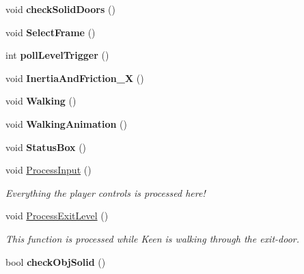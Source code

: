 \begin{DoxyCompactItemize}
\item 
\hypertarget{class_c_player_aaf29ec91431dddfa0072db4d9fad8549}{
void {\bfseries checkSolidDoors} ()}
\label{class_c_player_aaf29ec91431dddfa0072db4d9fad8549}

\item 
\hypertarget{class_c_player_a40f4e2426228714201723bb45352aff1}{
void {\bfseries SelectFrame} ()}
\label{class_c_player_a40f4e2426228714201723bb45352aff1}

\item 
\hypertarget{class_c_player_a2b7a24347e98d918ae5a59109007005c}{
int {\bfseries pollLevelTrigger} ()}
\label{class_c_player_a2b7a24347e98d918ae5a59109007005c}

\item 
\hypertarget{class_c_player_a8821b02169febd68fc95e06e8a9934b3}{
void {\bfseries InertiaAndFriction\_\-X} ()}
\label{class_c_player_a8821b02169febd68fc95e06e8a9934b3}

\item 
\hypertarget{class_c_player_a2d0bf01a95ea52400563440ba4b2acd7}{
void {\bfseries Walking} ()}
\label{class_c_player_a2d0bf01a95ea52400563440ba4b2acd7}

\item 
\hypertarget{class_c_player_a7f0c07ed93210b00c317b610ef8d0b35}{
void {\bfseries WalkingAnimation} ()}
\label{class_c_player_a7f0c07ed93210b00c317b610ef8d0b35}

\item 
\hypertarget{class_c_player_a0ba24f0822723cef4643d4c6ea9957bf}{
void {\bfseries StatusBox} ()}
\label{class_c_player_a0ba24f0822723cef4643d4c6ea9957bf}

\item 
\hypertarget{class_c_player_ac43ad1f02ccac8b7991754e82ad49e4d}{
void \hyperlink{class_c_player_ac43ad1f02ccac8b7991754e82ad49e4d}{ProcessInput} ()}
\label{class_c_player_ac43ad1f02ccac8b7991754e82ad49e4d}

\begin{DoxyCompactList}\small\item\em Everything the player controls is processed here! \item\end{DoxyCompactList}\item 
\hypertarget{class_c_player_a02eff7ded41c1c4f089b4f26a1d91b4d}{
void \hyperlink{class_c_player_a02eff7ded41c1c4f089b4f26a1d91b4d}{ProcessExitLevel} ()}
\label{class_c_player_a02eff7ded41c1c4f089b4f26a1d91b4d}

\begin{DoxyCompactList}\small\item\em This function is processed while Keen is walking through the exit-\/door. \item\end{DoxyCompactList}\item 
\hypertarget{class_c_player_a374e42a20d7274d3f9804507bd2ea3b0}{
bool {\bfseries checkObjSolid} ()}
\label{class_c_player_a374e42a20d7274d3f9804507bd2ea3b0}


\end{DoxyCompactItemize}
